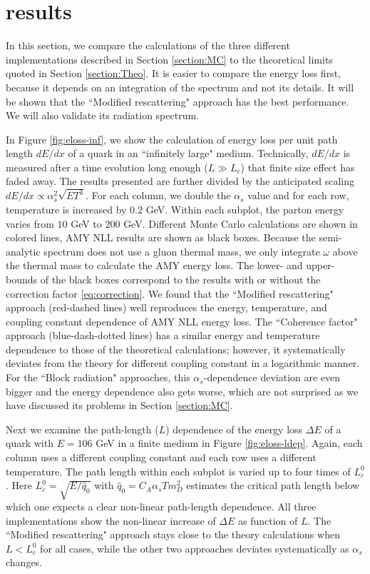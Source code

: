 \documentclass[aps, prc, reprint, amsmath, groupedaddress, nofootinbib]{revtex4-1}
\begin{document}
{\section{results}\label{section:results}
In this section, we compare the calculations of the three different implementations described in Section \ref{section:MC} to the theoretical limits quoted in Section \ref{section:Theo}. 
It is easier to compare the energy loss first, because it depends on an integration of the spectrum and not its details.
It will be shown that the ``Modified rescattering" approach has the best performance. 
We will also validate its radiation spectrum.


In Figure \ref{fig:eloss-inf}, we show the calculation of energy loss per unit path length $dE/dx$ of a quark in an ``infinitely large" medium. 
Technically, $dE/dx$ is measured after a time evolution long enough ($L\gg L_c$) that finite size effect has faded away.
The results presented are further divided by the anticipated scaling $dE/dx \propto \alpha_s^2 \sqrt{ET^3}$.
For each column, we double the $\alpha_s$ value and for each row, temperature is increased by $0.2$ GeV. 
Within each subplot, the parton energy varies from $10$ GeV to $200$ GeV.
Different Monte Carlo calculations are shown in colored lines, AMY NLL results are shown as black boxes. 
Because the semi-analytic spectrum does not use a gluon thermal mass, we only integrate $\omega$ above the thermal mass to calculate the AMY energy loss. 
The lower- and upper-bounds of the black boxes correspond to the results with or without the correction factor \ref{eq:correction}.
We found that the ``Modified rescattering" approach (red-dashed lines) well reproduces the energy, temperature, and coupling constant dependence of AMY NLL energy loss.
The ``Coherence factor" approach (blue-dash-dotted lines) has a similar energy and temperature dependence to those of the theoretical calculations; however, it systematically deviates from the theory for different coupling constant in a logarithmic manner.
For the ``Block radiation" approaches, this $\alpha_s$-dependence deviation are even bigger and the energy dependence also gets worse, which are not surprised as we have discussed its problems in Section \ref{section:MC}.

Next we examine the path-length ($L$) dependence of the energy loss $\Delta E$ of a quark with $E = 106$ GeV in a finite medium in Figure \ref{fig:eloss-ldep}.
Again, each column uses a different coupling constant and each row uses a different temperature. 
The path length within each subplot is varied up to four times of $L_c^0$.
Here $L_c^0 = \sqrt{E/\hat{q}_0}$ with $\hat{q}_0 = C_A \alpha_s T m_D^2$ estimates the critical path length below which one expects a clear non-linear path-length dependence.
All three implementations show the non-linear increase of $\Delta E$ as function of $L$.
The ``Modified rescattering" approach stays close to the theory calculations when $L<L_c^0$ for all cases, while the other two approaches deviates systematically as $\alpha_s$ changes.

}
\end{document}
